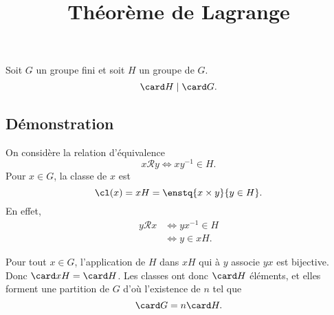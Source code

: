 \documentclass[fontsize=12pt,twoside=false,parskip=half]{scrartcl}
\title{Théorème de Lagrange}
\date{}
\author{}
\begin{document}
\maketitle
   \begin{Theoreme}
      Soit $G$ un groupe fini et soit $H$ un groupe de $G$.
      \[
         \card H \mid \card G.
      \]
   \end{Theoreme}
   \subsection{Démonstration}
      On considère la relation d’équivalence
      \[
         x \mathcal{R} y \iff xy^{-1} \in H. 
      \]
      Pour $x \in G$, la classe de $x$ est
      \[
         \cl(x) = xH = \enstq{x \times y}{y \in H}.
      \]
      En effet,
      \begin{align*}
         y \mathcal{R} x &\iff yx^{-1} \in H\\
                         &\iff y \in xH.
      \end{align*}
      
      Pour tout $x \in G$, l’application de $H$ dans $xH$ qui à $y$ associe $yx$ est bijective.
      Donc $\card xH = \card H$. Les classes ont donc $\card H$ éléments, et elles forment une 
      partition de $G$ d’où l’existence de $n$ tel que
      \[
         \card G = n \card H.
      \]  
\end{document}
